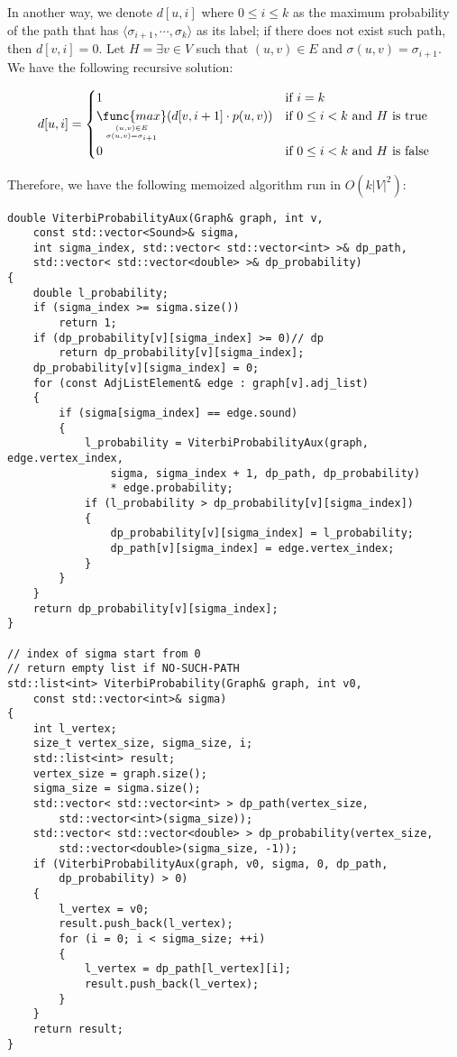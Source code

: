 \noindent
In another way,
we denote $d[u,i]$ where $0 \leq i \leq k$ as the maximum probability
of the path that has 
$\langle \sigma_{i+1}, \cdots, \sigma_k \rangle$ 
as its label; 
if there does not exist such path, then $d[v,i] = 0$.
Let $H = \exists v \in V$ such that $(u,v) \in E$ and $\sigma(u,v) = \sigma_{i+1}$.
We have the following recursive solution:

\begin{equation*}
    d[u,i] = 
    \begin{cases}
        1 & \text{if } i = k \\
        \mathop{\func{max}}\limits_{(u,v) \in E 
            \atop \sigma(u,v) = \sigma_{i+1}}
            (d[v,i+1] \cdot p(u,v))
            & \text{if } 0 \leq i < k \text{ and } H \text{ is true} \\
        0 & \text{if } 0 \leq i < k \text{ and } H \text{ is false}
    \end{cases}
\end{equation*}

\noindent
Therefore, we have the following memoized algorithm run in $O(k|V|^2)$:

\begin{verbatim}
double ViterbiProbabilityAux(Graph& graph, int v, 
    const std::vector<Sound>& sigma, 
    int sigma_index, std::vector< std::vector<int> >& dp_path, 
    std::vector< std::vector<double> >& dp_probability)
{
    double l_probability;
    if (sigma_index >= sigma.size())
        return 1;
    if (dp_probability[v][sigma_index] >= 0)// dp
        return dp_probability[v][sigma_index];
    dp_probability[v][sigma_index] = 0;
    for (const AdjListElement& edge : graph[v].adj_list)
    {
        if (sigma[sigma_index] == edge.sound)
        {
            l_probability = ViterbiProbabilityAux(graph, edge.vertex_index, 
                sigma, sigma_index + 1, dp_path, dp_probability)
                * edge.probability;
            if (l_probability > dp_probability[v][sigma_index])
            {
                dp_probability[v][sigma_index] = l_probability;
                dp_path[v][sigma_index] = edge.vertex_index;
            }
        }
    }
    return dp_probability[v][sigma_index];
}

// index of sigma start from 0
// return empty list if NO-SUCH-PATH
std::list<int> ViterbiProbability(Graph& graph, int v0, 
    const std::vector<int>& sigma)
{
    int l_vertex;
    size_t vertex_size, sigma_size, i;
    std::list<int> result;
    vertex_size = graph.size();
    sigma_size = sigma.size();
    std::vector< std::vector<int> > dp_path(vertex_size, 
        std::vector<int>(sigma_size));
    std::vector< std::vector<double> > dp_probability(vertex_size, 
        std::vector<double>(sigma_size, -1));
    if (ViterbiProbabilityAux(graph, v0, sigma, 0, dp_path, 
        dp_probability) > 0)
    {
        l_vertex = v0;
        result.push_back(l_vertex);
        for (i = 0; i < sigma_size; ++i)
        {
            l_vertex = dp_path[l_vertex][i];
            result.push_back(l_vertex);
        }
    }
    return result;
}
\end{verbatim}


